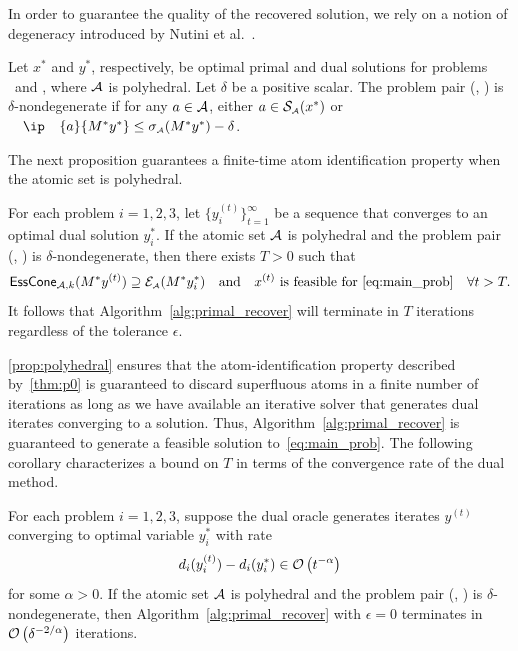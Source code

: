 In order to guarantee the quality of the recovered solution, we rely on a notion of degeneracy introduced by Nutini et al.~\cite{nutini2019active}. 

\begin{definition}
  Let $x^*$ and $y^*$, respectively, be optimal primal and dual solutions for problems \Probi\ and \Drobi, where $\mathcal{A}$ is polyhedral. Let $\delta$ be a positive scalar. The problem pair (\Probi, \Drobi) is $\delta$-nondegenerate if for any $a\in\mathcal{A}$, either $a\in\operatorname{\mathcal{S}_{\scriptscriptstyle\mathcal{A}}}(x^*)$ or $\ip{a}{M^*y^*} \leq \sigma\As(M^*y^*) - \delta$. 
\end{definition}

The next proposition guarantees a finite-time atom identification property when the atomic set is polyhedral.

\begin{proposition} \label{prop:polyhedral} For each problem $i
  = 1, 2, 3$, let $\{y_i^{(t)}\}_{t=1}^\infty$ be a sequence that converges to an optimal dual solution $y_i^*$. If the atomic set $\mathcal{A}$ is polyhedral and the problem pair (\Probi, \Drobi) is $\delta$-nondegenerate, then there exists $T > 0$ such that 
  \[
   \operatorname{\sf EssCone}_{\mathcal{A}, k}(M^*y^{(t)}) \supseteq \mathcal{E}_{\scriptscriptstyle\mathcal{A}}( M^* y_i^*) 
  \hbox{\quad and\quad}
  x^{(t)} \mbox{ is feasible for } \eqref{eq:main_prob} 
  \quad \forall t>T.\]
  It follows that Algorithm~\ref{alg:primal_recover} will terminate in $T$ iterations regardless of the tolerance $\epsilon$. 
\end{proposition}

\autoref{prop:polyhedral} ensures that the atom-identification property described by~\autoref{thm:p0} is guaranteed to discard superfluous atoms in a finite number of iterations as long as we have available an iterative solver that generates dual iterates converging to a solution. Thus, Algorithm~\ref{alg:primal_recover} is guaranteed to generate a feasible solution to~\eqref{eq:main_prob}.
The following corollary characterizes a bound on $T$ in terms of the convergence rate of the dual method.

\begin{corollary} \label{coro:polyhedral}
  For each problem $i= 1, 2, 3$, suppose the dual oracle generates iterates $y^{(t)}$ converging to optimal variable $y_i^*$ with rate
  \[d_i(y_i^{(t)}) - d_i(y_i^*) \in \mathcal{O}\left( t^{-\alpha} \right)\]
  for some $\alpha > 0$. If the atomic set $\mathcal{A}$ is polyhedral and the problem pair (\Probi, \Drobi) is $\delta$-nondegenerate, then Algorithm~\ref{alg:primal_recover} with $\epsilon=0$ terminates in $\mathcal{O}\left(\delta^{-2/\alpha}\right)$ iterations. 
\end{corollary}


